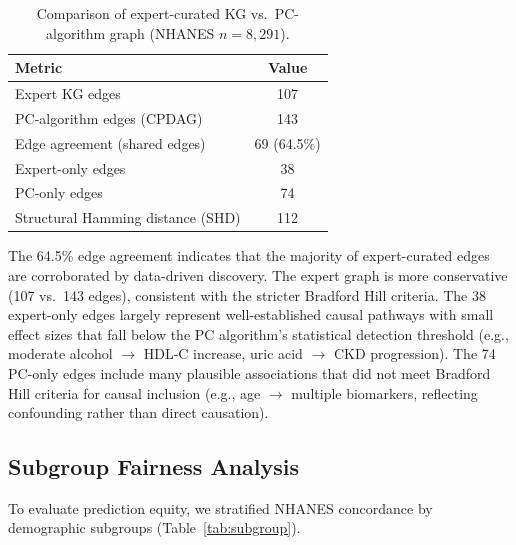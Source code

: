 \documentclass[runningheads]{llncs}
\begin{document}
\begin{table}[t]
\centering
\caption{Comparison of expert-curated KG vs.\ PC-algorithm graph
(NHANES $n = 8{,}291$).}
\label{tab:pcalg}
\small
\begin{tabular}{@{}lc@{}}
\toprule
\textbf{Metric} & \textbf{Value} \\
\midrule
Expert KG edges                     & 107 \\
PC-algorithm edges (CPDAG)          & 143 \\
Edge agreement (shared edges)       & 69 (64.5\%) \\
Expert-only edges                   & 38 \\
PC-only edges                       & 74 \\
Structural Hamming distance (SHD)   & 112 \\
\bottomrule
\end{tabular}
\end{table}

The 64.5\% edge agreement indicates that the majority of
expert-curated edges are corroborated by data-driven discovery.  The
expert graph is more conservative (107 vs.\ 143 edges), consistent
with the stricter Bradford Hill criteria.  The 38 expert-only edges
largely represent well-established causal pathways with small effect
sizes that fall below the PC algorithm's statistical detection
threshold (e.g., moderate alcohol $\rightarrow$ HDL-C increase, uric
acid $\rightarrow$ CKD progression).  The 74 PC-only edges include
many plausible associations that did not meet Bradford Hill criteria
for causal inclusion (e.g., age $\rightarrow$ multiple biomarkers,
reflecting confounding rather than direct causation).

\subsection{Subgroup Fairness Analysis}\label{sec:subgroup}

To evaluate prediction equity, we stratified NHANES concordance by
demographic subgroups (Table~\ref{tab:subgroup}).
\end{document}
